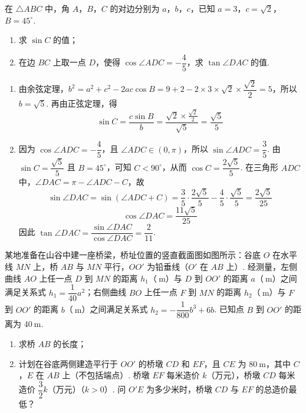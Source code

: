 \begin{problem}
在 \(\triangle ABC\) 中，角 \(A\)，\(B\)，\(C\) 的对边分别为 \(a\)，\(b\)，\(c\)，已知 \(a=3\)，\(c=\sqrt2\)，\(B=45^\circ\).

\begin{enumerate}
\item 求 \(\sin C\) 的值；
\item 在边 \(BC\) 上取一点 \(D\)，使得 \(\cos\angle ADC=-\dfrac45\)，求 \(\tan\angle DAC\) 的值.
\end{enumerate}

\end{problem}

\begin{solution}
\begin{enumerate}
\item 由余弦定理，\(b^2=a^2+c^2-2ac\cos B=9+2-2\times3\times\sqrt2\times\dfrac{\sqrt2}{2}=5\)，所以 \(b=\sqrt5\). 再由正弦定理，得
\[
\sin C=\dfrac{c\sin B}{b}=\dfrac{\sqrt2\times\frac{\sqrt2}{2}}{\sqrt5}=\dfrac{\sqrt5}{5}
\]
\item 因为 \(\cos\angle ADC=-\dfrac45\)，且 \(\angle ADC\in(0,\pi)\)，所以 \(\sin\angle ADC=\dfrac35\). 由 \(\sin C=\dfrac{\sqrt5}{5}\) 且 \(B=45^\circ\)，可知 \(C<90^\circ\)，从而 \(\cos C=\dfrac{2\sqrt5}{5}\). 在三角形 \(ADC\) 中，\(\angle DAC=\pi-\angle ADC-C\)，故
\[
\sin\angle DAC=\sin(\angle ADC+C)=\dfrac35\cdot\dfrac{2\sqrt5}{5}-\dfrac45\cdot\dfrac{\sqrt5}{5}=\dfrac{2\sqrt5}{25}
\]
\[
\cos\angle DAC=\dfrac{11\sqrt5}{25}
\]
因此 \(\tan\angle DAC=\dfrac{\sin\angle DAC}{\cos\angle DAC}=\dfrac2{11}\).
\end{enumerate}
\end{solution}

\begin{problem}
某地准备在山谷中建一座桥梁，桥址位置的竖直截面图如图所示：谷底 \(O\) 在水平线 \(MN\) 上，桥 \(AB\) 与 \(MN\) 平行，\(OO'\) 为铅垂线（\(O'\) 在 \(AB\) 上）. 经测量，左侧曲线 \(AO\) 上任一点 \(D\) 到 \(MN\) 的距离 \(h_1\)（\(\mathrm{~m}\)）与 \(D\) 到 \(OO'\) 的距离 \(a\)（\(\mathrm{~m}\)）之间满足关系式 \(h_1=\dfrac{1}{40}a^2\)；右侧曲线 \(BO\) 上任一点 \(F\) 到 \(MN\) 的距离 \(h_2\)（\(\mathrm{~m}\)）与 \(F\) 到 \(OO'\) 的距离 \(b\)（\(\mathrm{~m}\)）之间满足关系式 \(h_2=-\dfrac{1}{800}b^3+6b\). 已知点 \(B\) 到 \(OO'\) 的距离为 \(40\mathrm{~m}\).

\begin{enumerate}
\item 求桥 \(AB\) 的长度；
\item 计划在谷底两侧建造平行于 \(OO'\) 的桥墩 \(CD\) 和 \(EF\)，且 \(CE\) 为 \(80\mathrm{~m}\)，其中 \(C\)，\(E\) 在 \(AB\) 上（不包括端点）. 桥墩 \(EF\) 每米造价 \(k\)（万元），桥墩 \(CD\) 每米造价 \(\dfrac32k\)（万元）（\(k>0\)）. 问 \(O'E\) 为多少米时，桥墩 \(CD\) 与 \(EF\) 的总造价最低？
\end{enumerate}

\end{problem}

